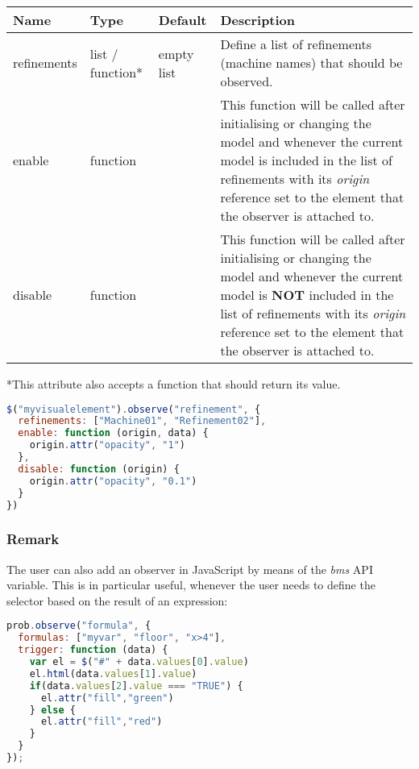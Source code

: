 \begin{tabular}{ l l l p{7cm} }
  \textbf{Name} & \textbf{Type} & \textbf{Default} & \textbf{Description} \\
  \hline\noalign{\medskip}
  refinements & list / function* & empty list & Define a list of refinements (machine names) that should be observed.\\
  \hline\noalign{\medskip}
  enable & function &  & This function will be called after initialising or changing the model and whenever the current model is included in the list of refinements with its \textit{origin} reference set to the element that the observer is attached to.\\
  \hline\noalign{\medskip}
  disable & function &  & This function will be called after initialising or changing the model and whenever the current model is \textbf{NOT} included in the list of refinements with its \textit{origin} reference set to the element that the observer is attached to.\\
\end{tabular}

*This attribute also accepts a function that should return its value.

\begin{lstlisting}[float=ht!,language=JavaScript]
$("myvisualelement").observe("refinement", {
  refinements: ["Machine01", "Refinement02"],
  enable: function (origin, data) {
    origin.attr("opacity", "1")
  },
  disable: function (origin) {
    origin.attr("opacity", "0.1")
  }
})
\end{lstlisting}

\subsubsection{Remark}

The user can also add an observer in JavaScript by means of the \textit{bms} API variable. 
This is in particular useful, whenever the user needs to define the selector based on the result of an expression:

\begin{lstlisting}[float=ht!,language=JavaScript]
prob.observe("formula", {
  formulas: ["myvar", "floor", "x>4"],
  trigger: function (data) {
    var el = $("#" + data.values[0].value)
    el.html(data.values[1].value)
    if(data.values[2].value === "TRUE") {
      el.attr("fill","green")
    } else {
      el.attr("fill","red")
    }
  }
});
\end{lstlisting}

